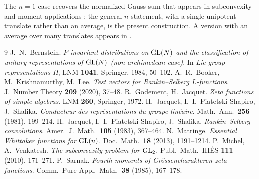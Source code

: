 The $n=1$ case recovers the normalized Gauss sum that appears in subconvexity and moment
applications \cite{Sarnak,MV}; the general-$n$ statement, with a single unipotent translate rather
than an average, is the present construction. A version with an average over many translates
appears in \cite{BKL}.

\begin{thebibliography}{9}
 J.~N.~Bernstein.
  \emph{$P$-invariant distributions on $\mathrm{GL}(N)$ and the classification of
  unitary representations of $\mathrm{GL}(N)$ (non-archimedean case)}. In
  \emph{Lie group representations II}, LNM \textbf{1041}, Springer, 1984,
  50--102.
 A.~R.~Booker, M.~Krishnamurthy, M.~Lee.
  \emph{Test vectors for Rankin--Selberg $L$-functions}.
  J.\ Number Theory \textbf{209} (2020), 37--48.
 R.~Godement, H.~Jacquet.
  \emph{Zeta functions of simple algebras}. LNM \textbf{260}, Springer, 1972.
 H.~Jacquet, I.~I.~Piatetski-Shapiro, J.~Shalika.
  \emph{Conducteur des repr\'esentations du groupe lin\'eaire}.
  Math.\ Ann.\ \textbf{256} (1981), 199--214.
 H.~Jacquet, I.~I.~Piatetski-Shapiro, J.~Shalika.
  \emph{Rankin--Selberg convolutions}.
  Amer.\ J.\ Math.\ \textbf{105} (1983), 367--464.
 N.~Matringe.
  \emph{Essential Whittaker functions for $\mathrm{GL}(n)$}.
  Doc.\ Math.\ \textbf{18} (2013), 1191--1214.
 P.~Michel, A.~Venkatesh.
  \emph{The subconvexity problem for $\mathrm{GL}_2$}.
  Publ.\ Math.\ IH\'ES \textbf{111} (2010), 171--271.
 P.~Sarnak.
  \emph{Fourth moments of Gr\"ossencharakteren zeta functions}.
  Comm.\ Pure Appl.\ Math.\ \textbf{38} (1985), 167--178.
\end{thebibliography}

\endgroup

\endgroup
